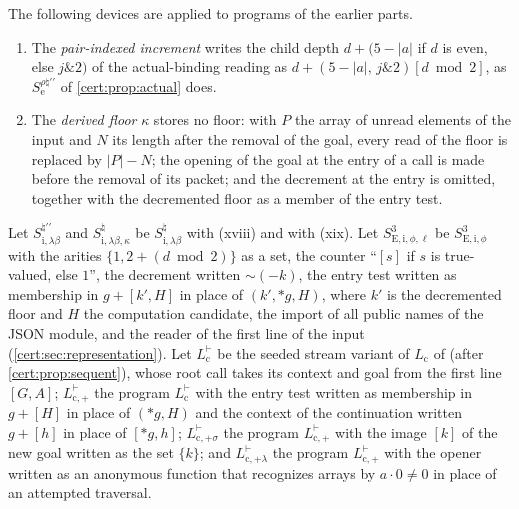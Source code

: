 The following devices are applied to programs of the earlier parts.
\begin{enumerate}[label=(\roman*),start=18]
\item The \emph{pair-indexed increment} writes the child depth
$d+(5-\lvert a\rvert$ if $d$ is even, else $j\mathbin{\&}2)$ of the actual-binding reading as
$d+(5-\lvert a\rvert,\,j\mathbin{\&}2)[d\bmod 2]$, as $S^{\rho\natural\prime\prime}_{\mathrm e}$ of
\cref{cert:prop:actual} does.
\item The \emph{derived floor} $\kappa$ stores no floor: with $P$ the array of unread elements of
the input and $N$ its length after the removal of the goal, every read of the floor is replaced
by $\lvert P\rvert-N$; the opening of the goal at the entry of a call is made before the removal
of its packet; and the decrement at the entry is omitted, together with the decremented floor as
a member of the entry test.
\end{enumerate}
Let $S^{\natural\prime\prime}_{\mathrm{i},\lambda\beta}$ and $S^{\natural}_{\mathrm{i},\lambda\beta,\kappa}$
be $S^{\natural}_{\mathrm{i},\lambda\beta}$ with (xviii) and with (xix). Let
$S^{3}_{\mathrm{E,i},\phi,\ell}$ be $S^{3}_{\mathrm{E,i},\phi}$ with the arities
$\{1,2+(d\bmod 2)\}$ as a set, the counter ``$[s]$ if $s$ is true-valued, else $1$'', the decrement
written $\mathord{\sim}(-k)$, the entry test written as membership in $g+[k',H]$ in place of
$(k',{*}g,H)$, where $k'$ is the decremented floor and $H$ the computation candidate, the import of
all public names of the JSON module, and the reader of the first line of the input
(\cref{cert:sec:representation}). Let $L^{\vdash}_{\mathrm c}$ be the seeded stream variant of
$L_{\mathrm c}$ of  (after \cref{cert:prop:sequent}), whose root call takes
its context and goal from the first line $[G,A]$; $L^{\vdash}_{\mathrm{c},+}$ the program
$L^{\vdash}_{\mathrm c}$ with the entry test written as membership in $g+[H]$ in place of $({*}g,H)$
and the context of the continuation written $g+[h]$ in place of $[{*}g,h]$;
$L^{\vdash}_{\mathrm{c},+\sigma}$ the program $L^{\vdash}_{\mathrm{c},+}$ with the image $[k]$ of the
new goal written as the set $\{k\}$; and $L^{\vdash}_{\mathrm{c},+\lambda}$ the program
$L^{\vdash}_{\mathrm{c},+}$ with the opener written as an anonymous function that recognizes arrays by
$a\cdot 0\neq 0$ in place of an attempted traversal.

